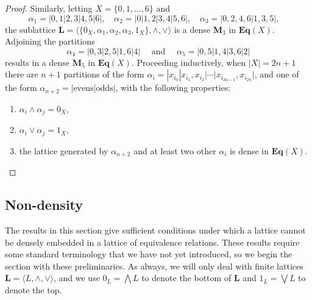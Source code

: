 \documentclass[cm,dissertation]{uhthesis}
\theoremstyle{plain}
\theoremstyle{definition}
\theoremstyle{remark}
\numberwithin{theorem}{section}
\numberwithin{claim}{chapter}
\numberwithin{equation}{section}
\numberwithin{conjecture}{chapter}
\newcommand{\<}{\ensuremath{\langle}}
\renewcommand{\>}{\ensuremath{\rangle}}
\newcommand{\meet}{\ensuremath{\wedge}}
\newcommand{\join}{\ensuremath{\vee}}
\newcommand{\Meet}{\ensuremath{\bigwedge}}
\renewcommand{\Join}{\ensuremath{\bigvee}}
\newcommand{\bEqX}{\ensuremath{\mathbf{Eq}(X)}}
\newcommand{\0}{\ensuremath{\mathbf{0}}}
\newcommand{\1}{\ensuremath{\mathbf{1}}}
\newcommand{\2}{\ensuremath{\mathbf{2}}}
\newcommand{\3}{\ensuremath{\mathbf{3}}}
\newcommand{\4}{\ensuremath{\mathbf{4}}}
\newcommand{\5}{\ensuremath{\mathbf{5}}}
\newcommand{\bL}{\ensuremath{\mathbf{L}}}
\newcommand{\bM}{\ensuremath{\mathbf{M}}}
\begin{document}
\begin{proof}
Similarly, letting
$X =  \{0,1,\dots, 6\}$ and %
\[
\alpha_1 = |0,1|2,3|4,5|6|, \quad 
\alpha_2 = |0|1,2|3,4|5,6|, \quad 
\alpha_3 = |0,2,4,6|1,3,5|, \quad 
\]
the sublattice 
$\bL  = \<\{0_X, \alpha_1, \alpha_2, \alpha_3, 1_X\}, \meet, \join\>$ is a dense $\bM_3$ in
\bEqX. Adjoining the partitions
\[
\alpha_4 = |0,3|2,5|1,6|4| \quad \text{ and } \quad \alpha_5 = |0,5|1,4|3,6|2|
\]
results in a dense $\bM_5$ in \bEqX.
Proceeding inductively, when $|X| = 2n+1$ there are $n+1$ partitions of
the form $\alpha_i = |x_{i_0}|x_{i_1}, x_{i_2}| \cdots | x_{i_{2n-1}},x_{i_{2n}}|$,
and one of the form 
$\alpha_{n+2} = |\text{evens} | \text{odds}|$, with the following properties:
\begin{enumerate}
\item $\alpha_i \meet \alpha_j = 0_X$,
\item $\alpha_i \join \alpha_j = 1_X$,
\item the lattice generated by $\alpha_{n+2}$ and at least two other $\alpha_i$ is dense in $\bEqX$.
\end{enumerate}
\end{proof}

\subsection{Non-density}
\label{sec:non-density}
The results in this section give sufficient conditions under which a lattice
cannot be densely embedded in a lattice of equivalence relations. 
These results require some standard terminology that we have not yet introduced,
so we begin the section with these preliminaries.  As always, we will only deal
with finite lattices $\bL = \<L, \meet, \join\>$, and we use $0_L = \Meet L$ to
denote the bottom of $\bL$ and $1_L = \Join L$ to denote the top.
\end{document}
